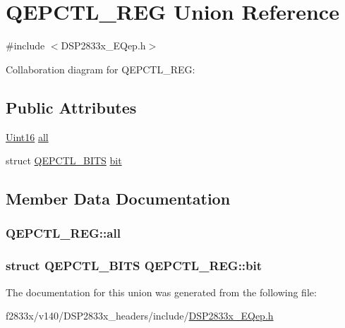 \hypertarget{union_q_e_p_c_t_l___r_e_g}{}\section{Q\+E\+P\+C\+T\+L\+\_\+\+R\+E\+G Union Reference}
\label{union_q_e_p_c_t_l___r_e_g}


{\ttfamily \#include $<$D\+S\+P2833x\+\_\+\+E\+Qep.\+h$>$}



Collaboration diagram for Q\+E\+P\+C\+T\+L\+\_\+\+R\+E\+G\+:
\subsection*{Public Attributes}
\begin{DoxyCompactItemize}
\item 
\hyperlink{_d_s_p2833x___device_8h_a59a9f6be4562c327cbfb4f7e8e18f08b}{Uint16} \hyperlink{union_q_e_p_c_t_l___r_e_g_a2c2a811fb57bf290ab5e85aa75816cad}{all}
\item 
struct \hyperlink{struct_q_e_p_c_t_l___b_i_t_s}{Q\+E\+P\+C\+T\+L\+\_\+\+B\+I\+T\+S} \hyperlink{union_q_e_p_c_t_l___r_e_g_a26d1f71620f5c17eebe83821c8f8110d}{bit}
\end{DoxyCompactItemize}


\subsection{Member Data Documentation}
\hypertarget{union_q_e_p_c_t_l___r_e_g_a2c2a811fb57bf290ab5e85aa75816cad}{}
\subsubsection[{all}]{ Q\+E\+P\+C\+T\+L\+\_\+\+R\+E\+G\+::all}\label{union_q_e_p_c_t_l___r_e_g_a2c2a811fb57bf290ab5e85aa75816cad}
\hypertarget{union_q_e_p_c_t_l___r_e_g_a26d1f71620f5c17eebe83821c8f8110d}{}
\subsubsection[{bit}]{\setlength{\rightskip}{0pt plus 5cm}struct {\bf Q\+E\+P\+C\+T\+L\+\_\+\+B\+I\+T\+S} Q\+E\+P\+C\+T\+L\+\_\+\+R\+E\+G\+::bit}\label{union_q_e_p_c_t_l___r_e_g_a26d1f71620f5c17eebe83821c8f8110d}


The documentation for this union was generated from the following file\+:\begin{DoxyCompactItemize}
\item 
f2833x/v140/\+D\+S\+P2833x\+\_\+headers/include/\hyperlink{_d_s_p2833x___e_qep_8h}{D\+S\+P2833x\+\_\+\+E\+Qep.\+h}\end{DoxyCompactItemize}
